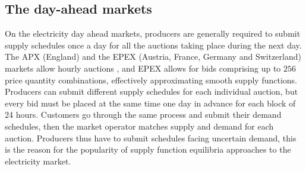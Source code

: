 %
%
%
%
%

\subsection{The day-ahead markets}

On the electricity day ahead markets, producers are generally required to submit supply schedules once a day for all the auctions taking place during the next day. The APX (England) and the EPEX (Austria, France, Germany and Switzerland) markets allow hourly auctions \cite{apx,epex}, and EPEX allows for bids comprising up to $256$ price quantity combinations, effectively approximating smooth supply functions. Producers can submit different supply schedules for each individual auction, but every bid must be placed at the same time one day in advance for each block of 24 hours. Customers go through the same process and submit their demand schedules, then the market operator matches supply and demand for each auction. Producers thus have to submit schedules facing uncertain demand, this is the reason for the popularity of supply function equilibria approaches to the electricity market.\\   

